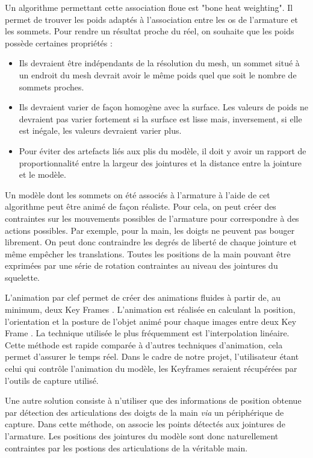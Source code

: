 Un algorithme permettant cette association floue est "bone heat weighting". \cite{baran2007automatic}
Il permet de trouver les poids adaptés à l'association entre les os de l'armature et les sommets. Pour rendre un résultat proche du réel, on souhaite que les poids possède certaines propriétés : \\
\begin{itemize}
	\item Ils devraient être indépendants de la résolution du mesh, un sommet situé à un endroit du mesh devrait avoir le même poids quel
	que soit le nombre de sommets proches.
	\item Ils devraient varier de façon homogène avec la surface. Les valeurs de poids ne devraient pas varier fortement si la surface est lisse mais, inversement, si elle est inégale, les valeurs devraient varier plus.
	\item Pour éviter des artefacts liés aux plis du modèle, il doit y avoir un rapport de proportionnalité entre la largeur des jointures
	et la distance entre la jointure et le modèle.
\end{itemize}

Un modèle dont les sommets on été associés à l'armature à l'aide de cet algorithme peut être \og animé \fg  de façon réaliste.
Pour cela, on peut créer des contraintes sur les mouvements possibles de l'armature pour correspondre à des actions possibles.\newline
Par exemple, pour la main, les doigts ne peuvent pas bouger librement.
On peut donc contraindre les degrés de liberté de chaque jointure et même empêcher les translations.
Toutes les positions de la main pouvant être exprimées par une série de rotation contraintes au niveau des jointures du squelette.\newline

L'animation par clef permet de créer des animations fluides à partir de, au minimum, deux \og Key Frames \fg. L'animation est réalisée en calculant la position, l'orientation et la posture de l'objet animé pour chaque images entre deux \og Key Frame \fg. La technique utilisée le plus fréquemment est l'interpolation linéaire. Cette méthode est rapide comparée à d'autres techniques d'animation, cela permet d'assurer le temps réel. Dans le cadre de notre projet, l'utilisateur étant celui qui contrôle l'animation du modèle, les \og Keyframes \fg seraient récupérées par l'outils de capture utilisé.

Une autre solution consiste à n'utiliser que des informations de position obtenue par détection des articulations des doigts de la main \textit{via} un périphérique de capture.
Dans cette méthode, on associe les points détectés aux jointures de l'armature. Les positions des jointures du modèle sont donc naturellement contraintes par les postions des articulations de la véritable main.\newline

